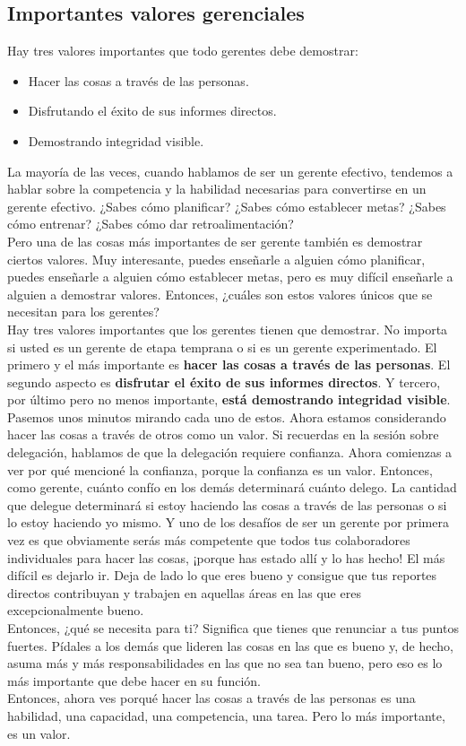 \documentclass[10pt]{book}
\begin{document}
\subsection{Importantes valores gerenciales}
Hay tres valores importantes que todo gerentes debe demostrar:
\begin{itemize}
\item Hacer las cosas a través de las personas.
\item Disfrutando el éxito de sus informes directos.
\item Demostrando integridad visible.
\end{itemize}
La mayoría de las veces, cuando hablamos de ser un gerente efectivo, tendemos a hablar sobre la competencia y la habilidad necesarias para convertirse en un gerente efectivo. ¿Sabes cómo planificar? ¿Sabes cómo establecer metas? ¿Sabes cómo entrenar? ¿Sabes cómo dar retroalimentación?\\
Pero una de las cosas más importantes de ser gerente también es demostrar ciertos valores. Muy interesante, puedes enseñarle a alguien cómo planificar, puedes enseñarle a alguien cómo establecer metas, pero es muy difícil enseñarle a alguien a demostrar valores. Entonces, ¿cuáles son estos valores únicos que se necesitan para los gerentes?\\
Hay tres valores importantes que los gerentes tienen que demostrar. No importa si usted es un gerente de etapa temprana o si es un gerente experimentado. El primero y el más importante es\textbf{ hacer las cosas a través de las personas}. El segundo aspecto es \textbf{disfrutar el éxito de sus informes directos}. Y tercero, por último pero no menos importante, \textbf{está demostrando integridad visible}.\\
Pasemos unos minutos mirando cada uno de estos. Ahora estamos considerando hacer las cosas a través de otros como un valor. Si recuerdas en la sesión sobre delegación, hablamos de que la delegación requiere confianza. Ahora comienzas a ver por qué mencioné la confianza, porque la confianza es un valor. Entonces, como gerente, cuánto confío en los demás determinará cuánto delego. La cantidad que delegue determinará si estoy haciendo las cosas a través de las personas o si lo estoy haciendo yo mismo. Y uno de los desafíos de ser un gerente por primera vez es que obviamente serás más competente que todos tus colaboradores individuales para hacer las cosas, ¡porque has estado allí y lo has hecho! El más difícil es dejarlo ir. Deja de lado lo que eres bueno y consigue que tus reportes directos contribuyan y trabajen en aquellas áreas en las que eres excepcionalmente bueno.\\
Entonces, ¿qué se necesita para ti? Significa que tienes que renunciar a tus puntos fuertes. Pídales a los demás que lideren las cosas en las que es bueno y, de hecho, asuma más y más responsabilidades en las que no sea tan bueno, pero eso es lo más importante que debe hacer en su función.\\
Entonces, ahora ves porqué hacer las cosas a través de las personas es una habilidad, una capacidad, una competencia, una tarea. Pero lo más importante, es un valor.
\end{document}
